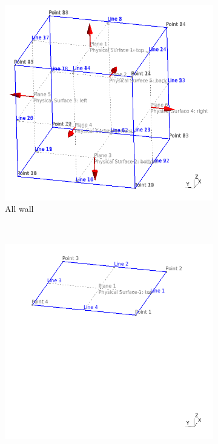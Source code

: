 \documentclass[a4]{article}
\begin{document}
\begin{figure}
  \centering
  \begin{subfigure}[b]{0.48\textwidth}
    \centering
    \includegraphics[width=\textwidth]{geometry_all.png}
    \caption{All wall}
    \label{fig:g1}
  \end{subfigure}
  \\
  \begin{subfigure}[b]{0.48\textwidth}
    \centering
    \includegraphics[width=\textwidth]{geometry_1.png}

\end{subfigure}
\end{figure}
\end{document}
